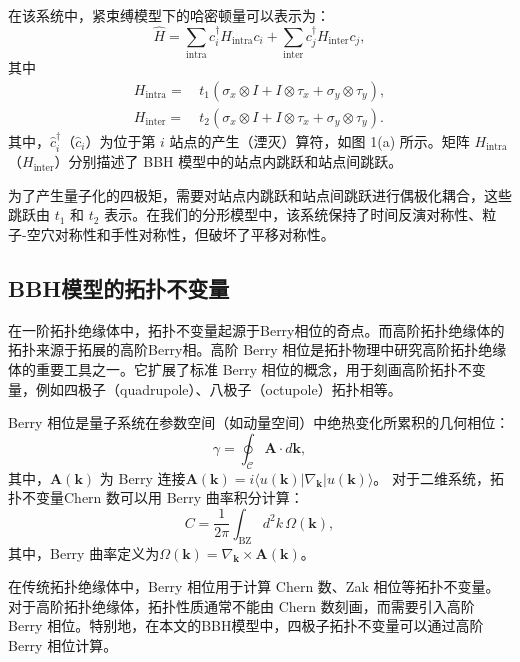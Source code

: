 在该系统中，紧束缚模型下的哈密顿量可以表示为：
\begin{equation}
\hat{H} = \sum_\text{intra} c_i^\dagger H_\text{intra} c_i + \sum_\text{inter} c_j^\dagger H_\text{inter} c_j,
\end{equation}
其中
\begin{equation}
\begin{aligned}
H_\text{intra} = & \, t_1 (\sigma_x \otimes I + I \otimes \tau_x + \sigma_y \otimes \tau_y), \\
H_\text{inter} = & \, t_2 (\sigma_x \otimes I + I \otimes \tau_x + \sigma_y \otimes \tau_y).
\end{aligned}
\end{equation}
其中，\( \hat{c}_i^\dagger \)（\( \hat{c}_i \)）为位于第 \( i \) 站点的产生（湮灭）算符，如图 1(a) 所示。矩阵 \( H_{\text{intra}} \)（\( H_{\text{inter}} \)）分别描述了 BBH 模型中的站点内跳跃和站点间跳跃。

为了产生量子化的四极矩，需要对站点内跳跃和站点间跳跃进行偶极化耦合，这些跳跃由 \( t_1 \) 和 \( t_2 \) 表示。在我们的分形模型中，该系统保持了时间反演对称性、粒子-空穴对称性和手性对称性，但破坏了平移对称性。

\subsection{BBH模型的拓扑不变量}
在一阶拓扑绝缘体中，拓扑不变量起源于Berry相位的奇点。而高阶拓扑绝缘体的拓扑来源于拓展的高阶Berry相。高阶 Berry 相位是拓扑物理中研究高阶拓扑绝缘体的重要工具之一。它扩展了标准 Berry 相位的概念，用于刻画高阶拓扑不变量，例如四极子（quadrupole）、八极子（octupole）拓扑相等。

Berry 相位是量子系统在参数空间（如动量空间）中绝热变化所累积的几何相位： 
\begin{equation}
    \gamma = \oint_{\mathcal{C}} \mathbf{A} \cdot d\mathbf{k},
\end{equation}
其中，\( \mathbf{A}(\mathbf{k}) \) 为 Berry 连接$\mathbf{A}(\mathbf{k}) = i \langle u(\mathbf{k}) | \nabla_{\mathbf{k}} | u(\mathbf{k}) \rangle$。
对于二维系统，拓扑不变量Chern 数可以用 Berry 曲率积分计算： 
\begin{equation}
    C = \frac{1}{2\pi} \int_{\text{BZ}} d^2k \, \Omega(\mathbf{k}),
\end{equation}
其中，Berry 曲率定义为$\Omega(\mathbf{k}) = \nabla_{\mathbf{k}} \times \mathbf{A}(\mathbf{k})$。

在传统拓扑绝缘体中，Berry 相位用于计算 Chern 数、Zak 相位等拓扑不变量。 对于高阶拓扑绝缘体，拓扑性质通常不能由 Chern 数刻画，而需要引入高阶 Berry 相位。特别地，在本文的BBH模型中，四极子拓扑不变量可以通过高阶 Berry 相位计算。

